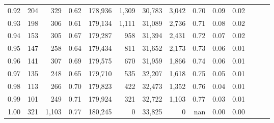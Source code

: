 \begin{tabular}{rrrrrrrrrrrrrr}
0.92 &    204 &    329 &  0.62 &  178,936 &    1,309 &  30,783 &   3,042 &  0.70 &  0.09 &      0.02 \\
0.93 &    198 &    306 &  0.61 &  179,134 &    1,111 &  31,089 &   2,736 &  0.71 &  0.08 &      0.02 \\
0.94 &    153 &    305 &  0.67 &  179,287 &      958 &  31,394 &   2,431 &  0.72 &  0.07 &      0.02 \\
0.95 &    147 &    258 &  0.64 &  179,434 &      811 &  31,652 &   2,173 &  0.73 &  0.06 &      0.01 \\
0.96 &    141 &    307 &  0.69 &  179,575 &      670 &  31,959 &   1,866 &  0.74 &  0.06 &      0.01 \\
0.97 &    135 &    248 &  0.65 &  179,710 &      535 &  32,207 &   1,618 &  0.75 &  0.05 &      0.01 \\
0.98 &    113 &    266 &  0.70 &  179,823 &      422 &  32,473 &   1,352 &  0.76 &  0.04 &      0.01 \\
0.99 &    101 &    249 &  0.71 &  179,924 &      321 &  32,722 &   1,103 &  0.77 &  0.03 &      0.01 \\
1.00 &    321 &  1,103 &  0.77 &  180,245 &        0 &  33,825 &       0 &   nan &  0.00 &      0.00 \\
\bottomrule
\end{tabular}
